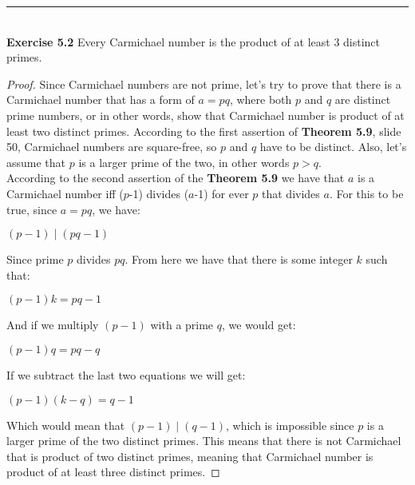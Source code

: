 \documentclass[a4paper]{article}
\begin{document}
\noindent\rule{12cm}{0.4pt}\\
\noindent \textbf{Exercise 5.2} Every Carmichael number is the product of at least 3 distinct primes.
\begin{proof}
Since Carmichael numbers are not prime, let's try to prove that there is a Carmichael number that has a form of $a=pq$, where both $p$ and $q$ are distinct prime numbers, or in other words, show that Carmichael number is product of at least two distinct primes. According to the first assertion of \textbf{Theorem 5.9}, slide 50, Carmichael numbers are square-free, so $p$ and $q$ have to be distinct. Also, let's assume that $p$ is a larger prime of the two, in other words $p > q$.\\
According to the second assertion of the \textbf{Theorem 5.9} we have that $a$ is a Carmichael number iff ($p$-1) divides ($a$-1) for ever $p$ that divides $a$. For this to be true, since $a = pq$, we have:
\begin{center}
$(p-1) \mid (pq - 1)$
\end{center}
Since prime $p$ divides $pq$. From here we have that there is some integer $k$ such that:
\begin{center}
$(p-1)k = pq - 1$
\end{center}
And if we multiply $(p-1)$ with a prime $q$, we would get:
\begin{center}
$(p-1)q = pq - q$
\end{center}
If we subtract the last two equations we will get:
\begin{center}
$(p-1)(k-q) = q - 1$
\end{center}
Which would mean that $(p-1) \mid (q-1)$, which is impossible since $p$ is a larger prime of the two distinct primes. This means that there is not Carmichael that is product of two distinct primes, meaning that Carmichael number is product of at least three distinct primes.
\end{proof}
\end{document}

